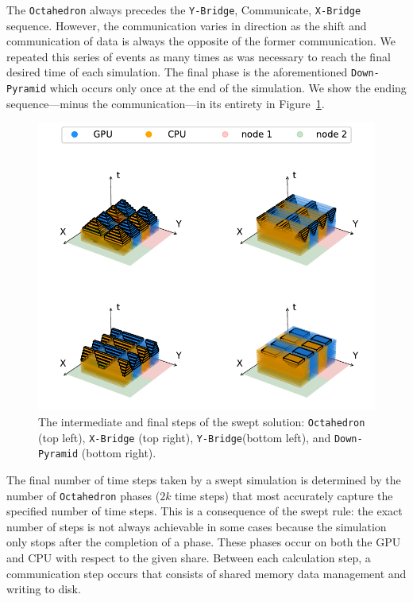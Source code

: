 \documentclass[preprints,article,accept,moreauthors,pdftex]{Definitions/mdpi}
\def\Down{\texttt{Down-Pyramid}}
\def\Oct{\texttt{Octahedron}}
\def\Xb{\texttt{X-Bridge}}
\def\Yb{\texttt{Y-Bridge}}
\begin{document}
The \Oct{} always precedes the \Yb{}, Communicate, \Xb{} sequence. However, the communication varies in direction as the shift and communication of data is always the opposite of the former communication. We repeated this series of events as many times as was necessary to reach the final desired time of each simulation. The final phase is the aforementioned \Down{} which occurs only once at the end of the simulation. We show the ending sequence---minus the communication---in its entirety in Figure~\ref{fig:MainTwo}. 


\begin{figure}[htbp]
    \centering
    \includegraphics{figs/SubsPlot2.pdf}
    \caption{The intermediate and final steps of the swept solution: \Oct{} (top left), \Xb{} (top right), \Yb (bottom left), and \Down{} (bottom right).}
    \label{fig:MainTwo}
\end{figure}

The final number of time steps taken by a swept simulation is determined by the number of \Oct{} phases ($2k$ time steps) that most accurately capture the specified number of time steps. This is a consequence of the swept rule: the exact number of steps is not always achievable in some cases because the simulation only stops after the completion of a phase. These phases occur on both the GPU and CPU with respect to the given share. Between each calculation step, a communication step occurs that consists of shared memory data management and writing to disk. 
\end{document}
